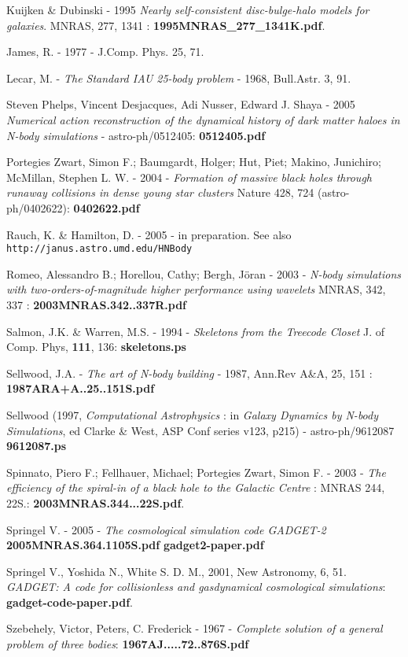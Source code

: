 \begin{itemize}
\begin{itemize}
Kuijken \& Dubinski - 1995 {\it Nearly self-consistent disc-bulge-halo models for galaxies}.
MNRAS, 277, 1341 : {\bf 1995MNRAS\_277\_1341K.pdf}.

James, R. - 1977 -  J.Comp. Phys. 25, 71.

Lecar, M. - {\it The Standard IAU 25-body problem} - 1968, Bull.Astr. 3, 91. 

Steven Phelps, Vincent Desjacques, Adi Nusser, Edward J. Shaya - 2005
{\it Numerical action reconstruction of the dynamical history of dark matter haloes in N-body simulations} -
astro-ph/0512405:   {\bf 0512405.pdf}

Portegies Zwart, Simon F.; Baumgardt, Holger; Hut, Piet; Makino, Junichiro; McMillan, Stephen L. W. -
2004 - {\it Formation of massive black holes through runaway collisions in dense young star clusters}
Nature 428, 724 (astro-ph/0402622): {\bf 0402622.pdf}

Rauch, K. \& Hamilton, D. - 2005 - in preparation. See also
{\tt http://janus.astro.umd.edu/HNBody}


Romeo, Alessandro B.; Horellou, Cathy; Bergh, Jöran - 2003 - 
{\it N-body simulations with two-orders-of-magnitude higher performance using wavelets}
MNRAS, 342, 337 : {\bf 2003MNRAS.342..337R.pdf}

Salmon, J.K. \& Warren, M.S. - 1994 -
{\it Skeletons from the Treecode Closet} J. of Comp. Phys, {\bf 111}, 136:
{\bf skeletons.ps}

Sellwood, J.A. - {\it The art of N-body building} - 1987, Ann.Rev A\&A, 25, 151 : 
{\bf 1987ARA+A..25..151S.pdf}


Sellwood (1997, {\it Computational Astrophysics} :
in {\it Galaxy Dynamics by N-body Simulations},
ed Clarke \& West,  ASP  Conf  series  v123, p215) - astro-ph/9612087
{\bf 9612087.ps}

Spinnato, Piero F.; Fellhauer, Michael; Portegies Zwart, Simon F. - 2003 -
{\it The efficiency of the spiral-in of a black hole to the Galactic Centre} :
MNRAS 244, 22S.: {\bf 2003MNRAS.344...22S.pdf}.

Springel V. - 2005 -
{\it The cosmological simulation code GADGET-2}
{\bf 2005MNRAS.364.1105S.pdf} {\bf gadget2-paper.pdf}

Springel V., Yoshida N., White S. D. M., 2001, New Astronomy, 6, 51. 
{\it GADGET: A code for collisionless and gasdynamical cosmological simulations}:
{\bf gadget-code-paper.pdf}.

Szebehely, Victor, Peters, C. Frederick - 1967 - 
{\it Complete solution of a general problem of three bodies}:
{\bf 1967AJ.....72..876S.pdf}


\end{itemize}
\end{itemize}
